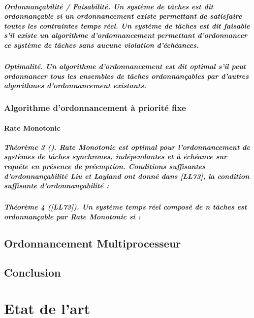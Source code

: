 \paragraph{
\textbf{Ordonnançabilité / Faisabilité}. Un système de tâches est dit ordonnançable si un ordonnancement existe permettant de satisfaire toutes les contraintes temps réel. Un système de tâches est dit faisable s’il existe un algorithme d’ordonnancement permettant d’ordonnancer ce système de tâches sans aucune violation d’échéances.}


\paragraph{
\textbf{Optimalité}. Un algorithme d’ordonnancement est dit optimal s’il peut ordonnancer tous les ensembles de tâches ordonnançables par d’autres algorithmes d’ordonnancement existants.}

\subsection{Algorithme d’ordonnancement à priorité fixe}
\subsubsection{Rate Monotonic}
\paragraph
{\textbf{Théorème 3 (\cite{LL73})}. Rate Monotonic est optimal pour l'ordonnancement de systèmes de tâches synchrones, indépendantes et à échéance sur requête en présence de préemption.
Conditions suffisantes d'ordonnançabilité Liu et Layland ont donné dans [LL73], la condition suffisante d'ordonnançabilité : }
\paragraph
{\textbf{Théorème 4 ([LL73])}. Un système temps réel composé de n tâches est ordonnançable par Rate Monotonic si : }

\section{Ordonnancement Multiprocesseur}
\section{Conclusion}
\chapter{Etat de l'art}

